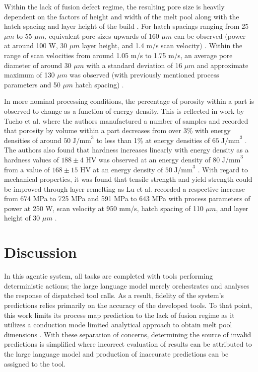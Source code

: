 Within the lack of fusion defect regime, the resulting pore size is heavily
dependent on the factors of height and width of the melt pool along with the
hatch spacing and layer height of the build \cite{cacace_lack_2022,
pak_thermopore_2024}. For hatch spacings ranging from 25 $\mu m$ to 55 $\mu m$,
equivalent pore sizes upwards of 160 $\mu m$ can be observed (power at around
100 W, 30 $\mu m$ layer height, and 1.4 m/s scan velocity)
\cite{pak_thermopore_2024}. Within the range of scan velocities from around 1.05
m/s to 1.75 m/s, an average pore diameter of around 30 $\mu m$ with a standard
deviation of 16 $\mu m$ and approximate maximum of 130 $\mu m$ was observed
(with previously mentioned process parameters and 50 $\mu m$ hatch spacing)
\cite{pak_thermopore_2024}.

In more nominal processing conditions, the percentage of porosity within a part
is observed to change as a function of energy density. This is reflected in work
by Tucho et al. where the authors manufactured a number of samples and recorded
that porosity by volume within a part decreases from over 3\% with energy
densities of around $50\;\text{J/mm}^3$ to less than 1\% at energy densities of
$65\;\text{J/mm}^3$ \cite{tucho_investigation_2018}. The authors also found that
hardness increases linearly with energy density as a hardness values of
$188\pm4$ HV was observed at an energy density of $80\;\text{J/mm}^3$ from a
value of $168\pm15$ HV at an energy density of $50\;\text{J/mm}^3$
\cite{tucho_investigation_2018}. With regard to mechanical properties, it was
found that tensile strength and yield strength could be improved through layer
remelting as Lu et al. recorded a respective increase from 674 MPa to 725 MPa
and 591 MPa to 643 MPa with process parameters of power at 250 W, scan velocity
at 950 mm/s, hatch spacing of 110 $\mu m$, and layer height of 30 $\mu m$
\cite{lu_research_2020, ahmed_process_2022}.


\section{Discussion}

In this agentic system, all tasks are completed with tools performing
deterministic actions; the large language model merely orchestrates and analyses
the response of dispatched tool calls. As a result, fidelity of the system's
predictions relies primarily on the accuracy of the developed tools. To that
point, this work limits its process map prediction to the lack of fusion regime
as it utilizes a conduction mode limited analytical approach to obtain melt pool
dimensions \cite{rosenthal_theory_2022}. With these separation of concerns,
determining the source of invalid predictions is simplified where incorrect
evaluation of results can be attributed to the large language model and
production of inaccurate predictions can be assigned to the tool.

